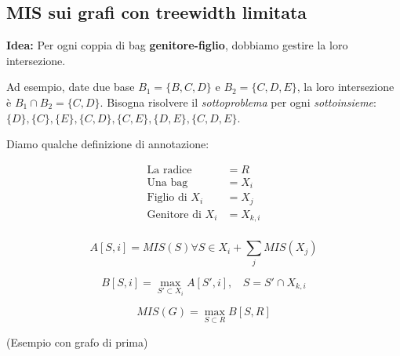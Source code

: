 \subsection{MIS sui grafi con treewidth limitata}

\textbf{Idea:} Per ogni coppia di bag \textbf{genitore-figlio}, dobbiamo gestire la loro intersezione.

Ad esempio, date due base $B_1= \{B,C,D\}$ e $B_2 = \{C,D,E\}$,
la loro intersezione è $B_1 \cap B_2 = \{C,D\}$. Bisogna risolvere il \textit{sottoproblema} per ogni \textit{sottoinsieme}:
$\{D\}, \{C\}, \{E\}, \{C,D\}, \{C,E\}, \{D,E\}, \{C,D,E\}$.

Diamo qualche definizione di annotazione:

\begin{equation}
    \begin{split}
        \text{La radice} & = R \\
        \text{Una bag} & = X_i \\
        \text{Figlio di $X_i$} & = X_j \\
        \text{Genitore di $X_i$} & = X_{k,i} \\
    \end{split}
\end{equation}

\[
  A[S,i] = MIS(S) \forall S \in X_i + \sum_j MIS(X_j)  
\]

\[
    B[S,i] = \max_{S' \subset X_i} A[S',i], \ \ \ \ S = S' \cap X_{k,i}
\]

\[
    MIS(G) = \max_{S \subset R} B[S,R]
\]


\begin{esempio}
    (Esempio con grafo di prima)
\end{esempio}

\begin{figure}[H]
    \begin{center}
    \end{center}
\end{figure}

